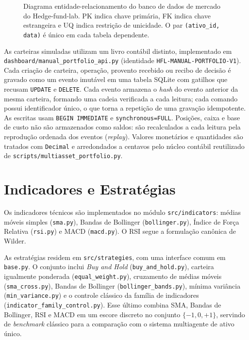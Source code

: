 \begin{figure}[htbp]
\caption{Diagrama entidade-relacionamento do banco de dados de mercado do Hedge-fund-lab. PK indica chave primária, FK indica chave estrangeira e UQ indica restrição de unicidade. O par \texttt{(ativo\_id, data)} é único em cada tabela dependente.}
\label{fig:hfl-der}
\end{figure}

As carteiras simuladas utilizam um livro contábil distinto, implementado em \texttt{dashboard/manual\_portfolio\_api.py} (identidade \texttt{HFL-MANUAL-PORTFOLIO-V1}). Cada criação de carteira, operação, provento recebido ou recibo de decisão é gravado como um evento imutável em uma tabela SQLite com gatilhos que recusam \texttt{UPDATE} e \texttt{DELETE}. Cada evento armazena o \textit{hash} do evento anterior da mesma carteira, formando uma cadeia verificada a cada leitura; cada comando possui identificador único, o que torna a repetição de uma gravação idempotente. As escritas usam \texttt{BEGIN IMMEDIATE} e \texttt{synchronous=FULL}. Posições, caixa e base de custo não são armazenados como saldos: são recalculados a cada leitura pela reprodução ordenada dos eventos (\textit{replay}). Valores monetários e quantidades são tratados com \texttt{Decimal} e arredondados a centavos pelo núcleo contábil reutilizado de \texttt{scripts/multiasset\_portfolio.py}.

\FloatBarrier
\section{Indicadores e Estratégias}

Os indicadores técnicos são implementados no módulo \texttt{src/indicators}: médias móveis simples (\texttt{sma.py}), Bandas de Bollinger (\texttt{bollinger.py}), Índice de Força Relativa (\texttt{rsi.py}) e MACD (\texttt{macd.py}). O RSI segue a formulação canônica de Wilder.

As estratégias residem em \texttt{src/strategies}, com uma interface comum em \texttt{base.py}. O conjunto inclui \textit{Buy and Hold} (\texttt{buy\_and\_hold.py}), carteira igualmente ponderada (\texttt{equal\_weight.py}), cruzamento de médias móveis (\texttt{sma\_cross.py}), Bandas de Bollinger (\texttt{bollinger\_bands.py}), mínima variância (\texttt{min\_variance.py}) e o controle clássico da família de indicadores (\texttt{indicator\_family\_control.py}). Esse último combina SMA, Bandas de Bollinger, RSI e MACD em um escore discreto no conjunto $\{-1, 0, +1\}$, servindo de \textit{benchmark} clássico para a comparação com o sistema multiagente de ativo único.

